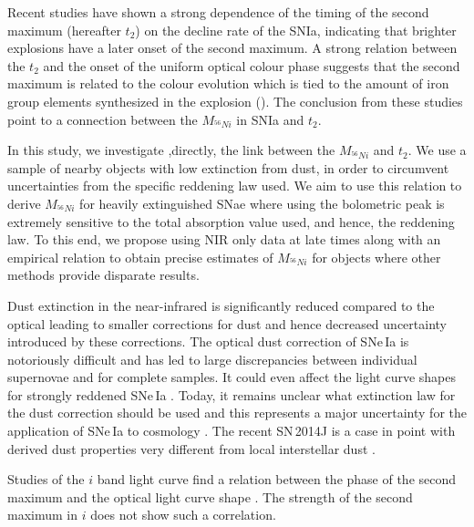 \documentclass{aa}
\begin{document}
Recent studies have shown a strong dependence of the timing of the second maximum (hereafter $t_2$)
on the decline rate of the SNIa, indicating that brighter explosions have a later onset of the second maximum. A strong relation
between the $t_2$ and the onset of the uniform optical colour phase \citep[hereafter $t_L$, see also $t_{max}$][]{Burns2014} suggests that the second maximum is related to the colour evolution
which is tied to the amount of iron group elements synthesized in the explosion (\cite{Kasen2007}). The conclusion from these studies point to a connection between 
the $M_{^{56}Ni}$ in SNIa and $t_2$. 

In this study, we investigate ,directly, the link between the  $M_{^{56}Ni}$ and $t_2$. We use a sample of nearby objects with low extinction from dust, in order to circumvent uncertainties
from the specific reddening law used. We aim to use this relation to derive $M_{^{56}Ni}$ for heavily extinguished SNae where using the bolometric peak is extremely sensitive to the 
total absorption value used, and hence, the reddening law. To this end, we propose using NIR only data at late times along with an empirical relation to obtain precise 
estimates of $M_{^{56}Ni}$ for objects where other methods provide disparate results. 


\iffalse
Dust extinction in the near-infrared is significantly reduced compared
to the optical leading to smaller corrections for dust and hence
decreased uncertainty introduced by these corrections. The optical dust
correction of SNe\,Ia is notoriously difficult and has led to large
discrepancies between individual supernovae and for complete samples. It
could even affect the light curve shapes for strongly reddened SNe\,Ia
\citep{Leibundgut1988, Amanullah2014}. Today, it remains unclear what
extinction law for the dust correction should be used \citep[see discussions in][]{Phillips2013, Scolnic2014} 
and this represents a major
uncertainty for the application of SNe\,Ia to cosmology
\citep[eg.][]{Peacock2006, Goobar2011}. The recent SN\,2014J is a case in
point with derived dust properties very different from local
interstellar dust \citep{Amanullah2014, Foley2014}. 




Studies of the $i$ band light curve find a relation between the phase
of the second maximum and the optical light curve shape 
\citep[e.g. $\Delta m_{15}(B)$, ][]{Folatelli2010, Hamuy1996}. The strength
of the second maximum in $i$ does not show such a correlation.
\end{document}
